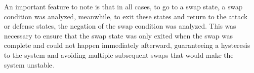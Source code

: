 An important feature to note is that in all cases, to go to a swap state, a swap condition was analyzed, meanwhile, to exit these states and return to the attack or defense states, the negation of the swap condition was analyzed. This was necessary to ensure that the swap state was only exited when the swap was complete and could not happen immediately afterward, guaranteeing a hysteresis to the system and avoiding multiple subsequent swaps that would make the system unstable.
